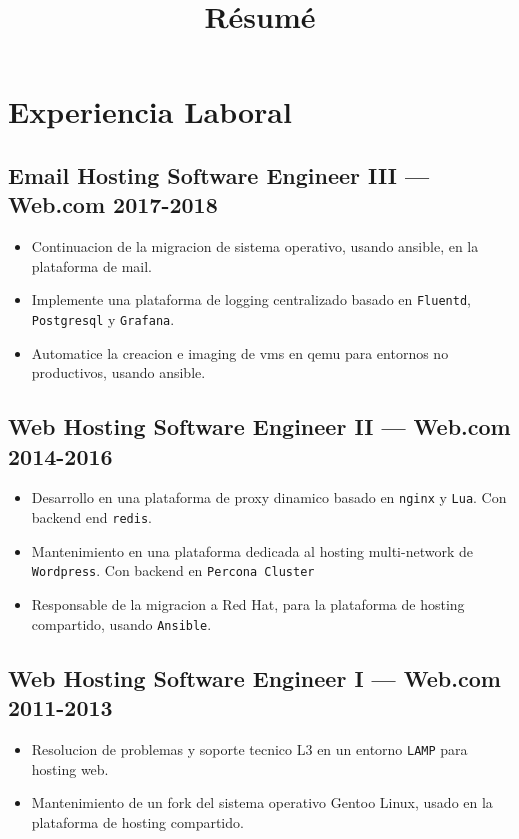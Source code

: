 \documentclass[11pt]{article}
\begin{document}
\title{R\'esum\'e}
\author{\FULLNAME}



\section{Experiencia Laboral}


\subsection{Email Hosting Software Engineer III --- Web.com \hfill 2017-2018}
\begin{itemize}
\item Continuacion de la migracion de sistema operativo, usando ansible, en la plataforma de mail.
\item Implemente una plataforma de logging centralizado basado en \texttt{Fluentd}, \texttt{Postgresql} y \texttt{Grafana}.
\item Automatice la creacion e imaging de vms en qemu para entornos no productivos, usando ansible.
\end{itemize}

\subsection{Web Hosting Software Engineer II --- Web.com \hfill 2014-2016}
\begin{itemize}
\item Desarrollo en una plataforma de proxy dinamico basado en \texttt{nginx} y \texttt{Lua}. Con backend end \texttt{redis}.
\item Mantenimiento en una plataforma dedicada al hosting multi-network de \texttt{Wordpress}. Con backend en \texttt{Percona Cluster}
\item Responsable de la migracion a Red Hat, para la plataforma de hosting compartido, usando \texttt{Ansible}.

\end{itemize}

\subsection{Web Hosting Software Engineer I --- Web.com \hfill 2011-2013}
\begin{itemize}
\item Resolucion de problemas y soporte tecnico L3 en un entorno \texttt{LAMP} para hosting web.
\item Mantenimiento de un fork del sistema operativo Gentoo Linux, usado en la plataforma de hosting compartido.
\end{itemize}
\end{document}
